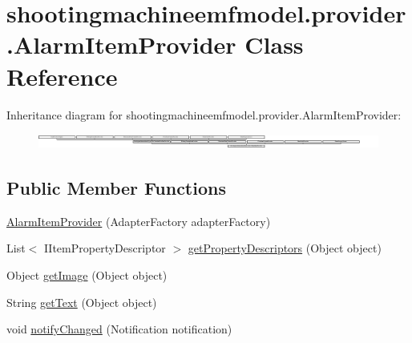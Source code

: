 \hypertarget{classshootingmachineemfmodel_1_1provider_1_1_alarm_item_provider}{\section{shootingmachineemfmodel.\-provider.\-Alarm\-Item\-Provider Class Reference}
\label{classshootingmachineemfmodel_1_1provider_1_1_alarm_item_provider}
}
Inheritance diagram for shootingmachineemfmodel.\-provider.\-Alarm\-Item\-Provider\-:\begin{figure}[H]
\begin{center}
\leavevmode
\includegraphics[height=0.499109cm]{classshootingmachineemfmodel_1_1provider_1_1_alarm_item_provider}
\end{center}
\end{figure}
\subsection*{Public Member Functions}
\begin{DoxyCompactItemize}
\item 
\hyperlink{classshootingmachineemfmodel_1_1provider_1_1_alarm_item_provider_a379202ec81c1a69f5e8e2587c345dfe2}{Alarm\-Item\-Provider} (Adapter\-Factory adapter\-Factory)
\item 
List$<$ I\-Item\-Property\-Descriptor $>$ \hyperlink{classshootingmachineemfmodel_1_1provider_1_1_alarm_item_provider_a4c477416f05cba19bcec16668a8ec939}{get\-Property\-Descriptors} (Object object)
\item 
Object \hyperlink{classshootingmachineemfmodel_1_1provider_1_1_alarm_item_provider_a8e53f712992608c54d862dedbc668a0b}{get\-Image} (Object object)
\item 
String \hyperlink{classshootingmachineemfmodel_1_1provider_1_1_alarm_item_provider_a3a878d5bf2baf7cee3584421d5114df2}{get\-Text} (Object object)
\item 
void \hyperlink{classshootingmachineemfmodel_1_1provider_1_1_alarm_item_provider_a33ebc8d99bc4db1b9a8f1fcbc1dfb197}{notify\-Changed} (Notification notification)
\end{DoxyCompactItemize}
